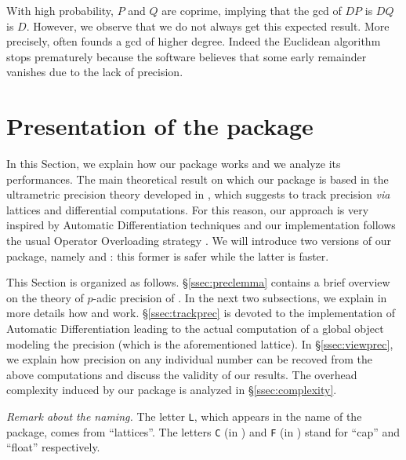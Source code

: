 \documentclass[sigconf]{acmart}
\newcommand{\ZpCR}{\text{\color{output} \rm \tt ZpCR}\xspace}
\newcommand{\ZpL}{\text{\color{output} \rm \tt ZpL}\xspace}
\newcommand{\ZpLC}{\text{\color{output} \rm \tt ZpLC}\xspace}
\newcommand{\ZpLF}{\text{\color{output} \rm \tt ZpLF}\xspace}
\theoremstyle{definition}
\begin{document}
\smallskip

\noindent
With high probability, $P$ and $Q$ are coprime, implying that the gcd of 
$DP$ is $DQ$ is $D$.  However, we observe that we do not always get this 
expected result. More precisely, \ZpCR often founds a gcd of higher 
degree. Indeed the Euclidean algorithm stops prematurely because the 
software believes that some early remainder vanishes due to the lack of 
precision.


\section{Presentation of the package}

In this Section, we explain how our package \ZpL works and we analyze
its performances.
The main theoretical result on which our package is based in the 
ultrametric precision theory developed in \cite{padicprec}, which 
suggests to track precision \emph{via} lattices and differential 
computations. For this reason, our approach is very inspired by 
Automatic Differentiation techniques \cite{} and our implementation 
follows the usual Operator Overloading strategy \cite{}.
We will introduce two versions of our package, namely \ZpLC and \ZpLF: 
this former is safer while the latter is faster.

This Section is organized as follows.
\S \ref{ssec:preclemma} contains a brief overview on the theory of
$p$-adic precision of \cite{padicprec}. 
In the next two subsections, we explain in more details how \ZpLC and 
\ZpLF work. \S \ref{ssec:trackprec} is devoted to the implementation of 
Automatic Differentiation leading to the actual computation of a
global object modeling the precision (which is the aforementioned 
lattice). 
In \S \ref{ssec:viewprec}, we explain how precision on any individual number
can be recoved from the above computations and discuss the validity
of our results.
The overhead complexity induced by our package is analyzed in
\S \ref{ssec:complexity}.

\smallskip

\noindent \textit{Remark about the naming.}
%
The letter \texttt{L}, which appears in the name of the package, 
comes from ``lattices''. The letters \texttt{C} (in \ZpLC) and 
\texttt{F} (in \ZpLF) stand for ``cap'' and ``float'' respectively.
\end{document}
